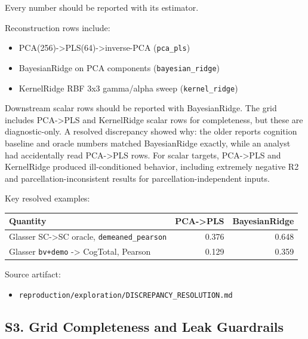 Every number should be reported with its estimator.

Reconstruction rows include:

\begin{itemize}
\tightlist
\item
  PCA(256)-\textgreater PLS(64)-\textgreater inverse-PCA (\texttt{pca\_pls})
\item
  BayesianRidge on PCA components (\texttt{bayesian\_ridge})
\item
  KernelRidge RBF 3x3 gamma/alpha sweep (\texttt{kernel\_ridge})
\end{itemize}

Downstream scalar rows should be reported with BayesianRidge. The grid includes PCA-\textgreater PLS and KernelRidge scalar rows for completeness, but these are diagnostic-only. A resolved discrepancy showed why: the older report\textquotesingle s cognition baseline and oracle numbers matched BayesianRidge exactly, while an analyst had accidentally read PCA-\textgreater PLS rows. For scalar targets, PCA-\textgreater PLS and KernelRidge produced ill-conditioned behavior, including extremely negative R2 and parcellation-inconsistent results for parcellation-independent inputs.

Key resolved examples:

{\def\LTcaptype{none} %
\begin{longtable}[]{@{}lrr@{}}
\toprule\noalign{}
Quantity & PCA-\textgreater PLS & BayesianRidge \\
\midrule\noalign{}
\endhead
\bottomrule\noalign{}
\endlastfoot
Glasser SC-\textgreater SC oracle, \texttt{demeaned\_pearson} & 0.376 & 0.648 \\
Glasser \texttt{bv+demo} -\textgreater{} CogTotal, Pearson & 0.129 & 0.359 \\
\end{longtable}
}

Source artifact:

\begin{itemize}
\tightlist
\item
  \texttt{reproduction/exploration/DISCREPANCY\_RESOLUTION.md}
\end{itemize}

\subsection{S3. Grid Completeness and Leak Guardrails}\label{s3-grid-completeness-and-leak-guardrails}

